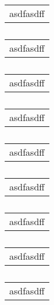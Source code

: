 \begin{table}
	\begin{tabular}{|l|}
		\hline
		asdfasdff
	\end{tabular}
	\caption[bla]{}
\end{table}
\begin{table}
	\begin{tabular}{|l|}
		\hline
		asdfasdff
	\end{tabular}
	\caption[bla]{}
\end{table}
\begin{table}
	\begin{tabular}{|l|}
		\hline
		asdfasdff
	\end{tabular}
	\caption[bla]{}
\end{table}
\begin{table}
	\begin{tabular}{|l|}
		\hline
		asdfasdff
	\end{tabular}
	\caption[bla]{}
\end{table}
\begin{table}
	\begin{tabular}{|l|}
		\hline
		asdfasdff
	\end{tabular}
	\caption[bla]{}
\end{table}
\begin{table}
	\begin{tabular}{|l|}
		\hline
		asdfasdff
	\end{tabular}
	\caption[bla]{}
\end{table}
\begin{table}
	\begin{tabular}{|l|}
		\hline
		asdfasdff
	\end{tabular}
	\caption[bla]{}
\end{table}
\begin{table}
	\begin{tabular}{|l|}
		\hline
		asdfasdff
	\end{tabular}
	\caption[bla]{}
\end{table}
\begin{table}
	\begin{tabular}{|l|}
		\hline
		asdfasdff
	\end{tabular}
	\caption[bla]{}
\end{table}

